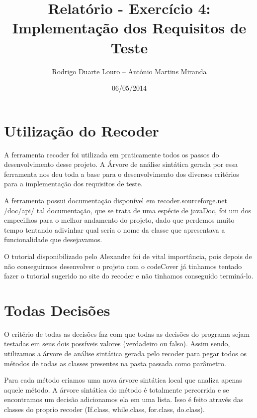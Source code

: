 \documentclass[12pt]{article} %
\begin{document}
\title{Relatório - Exercício 4: Implementação dos Requisitos de Teste} %
\author{Rodrigo Duarte Louro -- António Martins Miranda} %
\date{06/05/2014} %

\maketitle %

\newpage

\section{Utilização do Recoder}
\mbox{} %

	A ferramenta recoder foi utilizada em praticamente todos os passos do desenvolvimento desse projeto. 
A Árvore de análise sintática gerada por essa ferramenta nos deu toda a base para o desenvolvimento dos 
diversos critérios para a implementação dos requisitos de teste. 

	A ferramenta possui documentação disponível em recoder.sourceforge.net /doc/api/  tal documentação, que se trata de uma espécie de 
javaDoc, foi um dos empecilhos para o melhor andamento do projeto, dado que perdemos muito tempo tentando adivinhar qual seria o nome da classe que apresentava a funcionalidade que desejavamos. 
	
	O tutorial disponibilizado pelo Alexandre foi de vital importância, pois depois de não conseguirmos desenvolver o projeto 
com o codeCover já tinhamos tentado fazer o tutorial sugerido no site do recoder e não tinhamos conseguido terminá-lo. 

\section{Todas Decisões}
\mbox{}
	O critério de todas as decisões faz com que todas as decisões do programa sejam testadas em seus dois possíveis valores
(verdadeiro ou falso). Assim sendo, utilizamos a árvore de análise sintática gerada pelo recoder para pegar todos os métodos 
de todas as classes presentes na pasta passada como parâmetro. 
	
	Para cada método criamos uma nova árvore sintática local que analiza apenas aquele método.  A árvore sintática do método
é totalmente percorrida e se encontramos um decisão adicionamos ela em uma lista. Isso é feito através das classes do proprio recoder
(If.class, while.class, for.class, do.class). 
	
\end{document}
